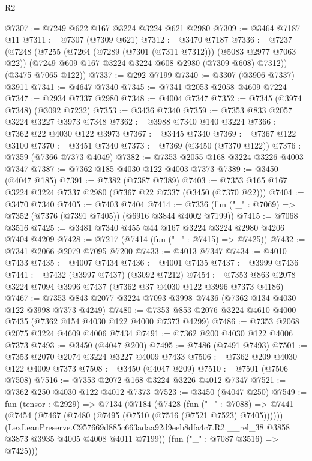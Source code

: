 \begin{lexlean}{R2}
\begin{coremodule}
@7307 := @7249 @622 @167 @3224 @3224 @621 @2980
@7309 := @3464 @7187 @11
@7311 := @7307 (@7309 @621)
@7312 := @3470 @7187
@7336 := @7237
    (@7248
      (@7255
        (@7264 (@7289 (@7301 (@7311 @7312))) (@5083 @2977 @7063 @22))
        (@7249 @609 @167 @3224 @3224 @608 @2980 (@7309 @608) @7312))
      (@3475 @7065 @122))
@7337 := @292 @7199
@7340 := @3307 (@3906 @7337) @3911
@7341 := @4647 @7340
@7345 := @7341 @2053 @2058 @4609 @7224
@7347 := @2934 @7337 @2980
@7348 := @4004 @7347
@7352 := @7345 (@3974 @7348) (@3092 @7232)
@7353 := @3436 @7340
@7359 := @7353 @833 @2057 @3224 @3227 @3973 @7348
@7362 := @3988 @7340 @140 @3224
@7366 := @7362 @22 @4030 @122 @3973
@7367 := @3445 @7340
@7369 := @7367 @122 @3100
@7370 := @3451 @7340
@7373 := @7369 (@3450 (@7370 @122))
@7376 := @7359 (@7366 @7373 @4049)
@7382 := @7353 @2055 @168 @3224 @3226 @4003 @7347
@7387 := @7362 @185 @4030 @122 @4003 @7373
@7389 := @3450 (@4047 @185)
@7391 := @7382 (@7387 @7389)
@7403 := @7353 @165 @167 @3224 @3224 @7337 @2980 (@7367 @22 @7337 (@3450 (@7370 @22)))
@7404 := @3470 @7340
@7405 := @7403 @7404
@7414 := @7336 (fun ("_" : @7069) => @7352 (@7376 (@7391 @7405)) (@6916 @3844 @4002 @7199))
@7415 := @7068 @3516
@7425 := @3481 @7340 @455 @44 @167 @3224 @3224 @2980 @4206 @7404 @4209
@7428 := @7217 (@7414 (fun ("_" : @7415) => @7425))
@7432 := @7341 @2066 @2079 @7095 @7200
@7433 := @4013 @7347
@7434 := @4010 @7433
@7435 := @4007 @7434
@7436 := @4001 @7435
@7437 := @3999 @7436
@7441 := @7432 (@3997 @7437) (@3092 @7212)
@7454 := @7353 @863 @2078 @3224 @7094 @3996 @7437 (@7362 @37 @4030 @122 @3996 @7373 @4186)
@7467 := @7353 @843 @2077 @3224 @7093 @3998 @7436 (@7362 @134 @4030 @122 @3998 @7373 @4249)
@7480 := @7353 @853 @2076 @3224 @4610 @4000 @7435 (@7362 @154 @4030 @122 @4000 @7373 @4299)
@7486 := @7353 @2068 @2075 @3224 @4609 @4006 @7434
@7491 := @7362 @200 @4030 @122 @4006 @7373
@7493 := @3450 (@4047 @200)
@7495 := @7486 (@7491 @7493)
@7501 := @7353 @2070 @2074 @3224 @3227 @4009 @7433
@7506 := @7362 @209 @4030 @122 @4009 @7373
@7508 := @3450 (@4047 @209)
@7510 := @7501 (@7506 @7508)
@7516 := @7353 @2072 @168 @3224 @3226 @4012 @7347
@7521 := @7362 @250 @4030 @122 @4012 @7373
@7523 := @3450 (@4047 @250)
@7549 := fun (tensor : @2929) =>
  @7134
    (@7184
      (@7428
        (fun ("_" : @7088) =>
        @7441
          (@7454 (@7467 (@7480 (@7495 (@7510 (@7516 (@7521 @7523) @7405))))))
          (LexLeanPreserve.C957669d885c663adaa92d9eeb8dfa4c7.R2.__rel_38
            @3858
            @3873
            @3935
            @4005
            @4008
            @4011
            @7199))
        (fun ("_" : @7087 @3516) => @7425)))

\end{coremodule}
\end{lexlean}
